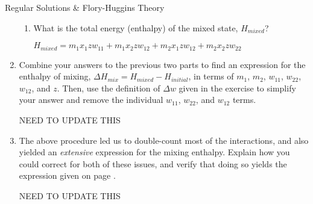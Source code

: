 \begin{activity}{Regular Solutions \& Flory-Huggins Theory}
\begin{exercises}
\begin{enumerate}
\begin{enumerate}
			\item What is the total energy (enthalpy) of the mixed state, $H_{mixed}$?
			
				\begin{solution}{}
				
					$H_{mixed} = m_1 x_1 z w_{11} + m_1 x_2 z w_{12} + m_2 x_1 z w_{12} + m_2 x_2 z w_{22}$
				
				\end{solution}
				
		\end{enumerate}
		
	\item Combine your answers to the previous two parts to find an expression for the enthalpy of mixing, $\Delta H_{mix} = H_{mixed} - H_{initial}$, in terms of $m_1$, $m_2$, $w_{11}$, $w_{22}$, $w_{12}$, and $z$.  Then, use the definition of $\Delta w$ given in the exercise to simplify your answer and remove the individual $w_{11}$, $w_{22}$, and $w_{12}$ terms.
	
		\begin{solution}{}
		
			NEED TO UPDATE THIS
		
		\end{solution}
		
	\item The above procedure led us to double-count most of the interactions, and also yielded an \emph{extensive} expression for the mixing enthalpy.  Explain how you could correct for both of these issues, and verify that doing so yields the expression given on page \pageref{\labelbase:eqn:Hmix}.
	
		\begin{solution}{}
		
			NEED TO UPDATE THIS
		
		\end{solution}
		
	\end{enumerate}
					
\end{exercises}
	
\end{activity}